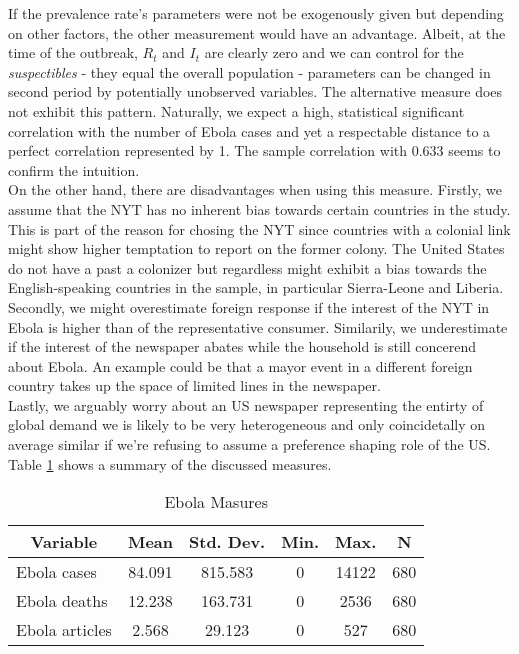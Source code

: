\documentclass{article}
\begin{document}
If the prevalence rate's parameters were not be exogenously given but depending on other factors, the other measurement would have an advantage. Albeit, at the time of the outbreak, $R_t$ and $I_t$ are clearly zero and we can control for the \textit{suspectibles} - they equal the overall population - parameters can be changed in second period by potentially unobserved variables. The alternative measure does not exhibit this pattern. Naturally, we expect a high, statistical significant correlation with the number of Ebola cases and yet a respectable distance to a perfect correlation represented by 1. The sample correlation with 0.633 seems to confirm the intuition. \\
On the other hand, there are disadvantages when using this measure.
Firstly, we assume that the NYT has no inherent bias towards certain countries in the study. This is part of the reason for chosing the NYT since countries with a colonial link might show higher temptation to report on the former colony. The United States do not have a past a colonizer but regardless might exhibit a bias towards the English-speaking countries in the sample, in particular Sierra-Leone and Liberia. \\
Secondly, we might overestimate foreign response if the interest of the NYT in Ebola is higher than of the representative consumer. Similarily, we underestimate if the interest of the newspaper abates while the household is still concerend about Ebola. An example could be that a mayor event in a different foreign country takes up the space of limited lines in the newspaper.\\
Lastly, we arguably worry about an US newspaper representing the entirty of global demand we is likely to be very heterogeneous and only coincidetally on average similar if we're refusing to assume a preference shaping role of the US. \\
Table \ref{Ebola Measures} shows a summary of the discussed measures.

\begin{table}[htbp]\centering \caption{Ebola Masures \label{Ebola Measures}}
\begin{tabular}{l c c c c c}\hline\hline
\multicolumn{1}{c}{\textbf{Variable}} & \textbf{Mean}
 & \textbf{Std. Dev.}& \textbf{Min.} &  \textbf{Max.} & \textbf{N}\\ \hline
Ebola cases & 84.091 & 815.583 & 0 & 14122 & 680 \\
Ebola deaths & 12.238 & 163.731 & 0 & 2536 & 680 \\
Ebola articles & 2.568 & 29.123 & 0 & 527 & 680 \\
\hline\end{tabular}
\end{table}
\end{document}
